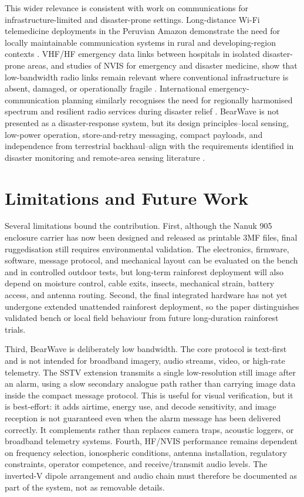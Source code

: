 \documentclass[acmsmall,screen]{acmart}
\begin{document}
This wider relevance is consistent with work on communications for infrastructure-limited and disaster-prone settings. Long-distance Wi-Fi telemedicine deployments in the Peruvian Amazon demonstrate the need for locally maintainable communication systems in rural and developing-region contexts \cite{Telemedicine}. VHF/HF emergency data links between hospitals in isolated disaster-prone areas, and studies of NVIS for emergency and disaster medicine, show that low-bandwidth radio links remain relevant where conventional infrastructure is absent, damaged, or operationally fragile \cite{Performance,Subekti2003NVIS}. International emergency-communication planning similarly recognises the need for regionally harmonised spectrum and resilient radio services during disaster relief \cite{ITU_EmergencyBands}. BearWave is not presented as a disaster-response system, but its design principles--local sensing, low-power operation, store-and-retry messaging, compact payloads, and independence from terrestrial backhaul--align with the requirements identified in disaster monitoring and remote-area sensing literature \cite{Disaster,Antarctica}.

\section{Limitations and Future Work}
Several limitations bound the contribution. First, although the Nanuk 905 enclosure carrier has now been designed and released as printable 3MF files, final ruggedisation still requires environmental validation. The electronics, firmware, software, message protocol, and mechanical layout can be evaluated on the bench and in controlled outdoor tests, but long-term rainforest deployment will also depend on moisture control, cable exits, insects, mechanical strain, battery access, and antenna routing. Second, the final integrated hardware has not yet undergone extended unattended rainforest deployment, so the paper distinguishes validated bench or local field behaviour from future long-duration rainforest trials.

Third, BearWave is deliberately low bandwidth. The core protocol is text-first and is not intended for broadband imagery, audio streams, video, or high-rate telemetry. The SSTV extension transmits a single low-resolution still image after an alarm, using a slow secondary analogue path rather than carrying image data inside the compact message protocol. This is useful for visual verification, but it is best-effort: it adds airtime, energy use, and decode sensitivity, and image reception is not guaranteed even when the alarm message has been delivered correctly. It complements rather than replaces camera traps, acoustic loggers, or broadband telemetry systems. Fourth, HF/NVIS performance remains dependent on frequency selection, ionospheric conditions, antenna installation, regulatory constraints, operator competence, and receive/transmit audio levels. The inverted-V dipole arrangement and audio chain must therefore be documented as part of the system, not as removable details.
\end{document}
